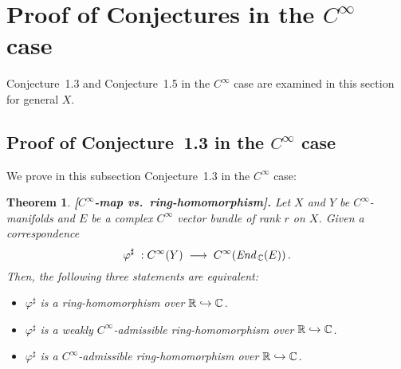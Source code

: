 \documentclass[11pt]{article}
\newtheorem{theorem}{Theorem}[subsection]
\numberwithin{equation}{subsection}
\newcommand{\End}{\mbox{\it End}\,}
\begin{document}
	

			
\bigskip

\section{Proof of Conjectures in the $C^{\infty}$ case}

Conjecture~1.3 and Conjecture~1.5 in the $C^{\infty}$ case are examined in this section for general $X$.



\bigskip

\subsection{Proof of Conjecture~1.3 in the $C^{\infty}$ case}

We prove in this subsection Conjecture~1.3 in the $C^{\infty}$ case:
			
\bigskip

\begin{theorem} {\bf [$C^{\infty}$-map vs.\ ring-homomorphism].}
 Let
   $X$ and $Y$ be $C^{\infty}$-manifolds  and
   $E$ be a complex $C^{\infty}$ vector bundle of rank $r$ on $X$.
 Given a correspondence
   $$
     \varphi^{\sharp}\;:
	   C^{\infty}(Y)\; \longrightarrow\; C^{\infty}(\End_{\Bbb C}(E))\,.
   $$
 Then, the following three statements are equivalent:
   \begin{itemize}
     \item[\rm (1)]
	  $\varphi^{\sharp}$ is a ring-homomorphism over ${\Bbb R}\hookrightarrow {\Bbb C}$.
	
     \item[\rm (2)]
	  $\varphi^{\sharp}$ is a weakly $C^{\infty}$-admissible ring-homomorphism
	   over ${\Bbb R}\hookrightarrow {\Bbb C}$.
	
	 \item[\rm (3)]
	  $\varphi^{\sharp}$ is a $C^{\infty}$-admissible ring-homomorphism
	   over ${\Bbb R}\hookrightarrow {\Bbb C}$.
   \end{itemize}
\end{theorem}

\medskip
\end{document}
